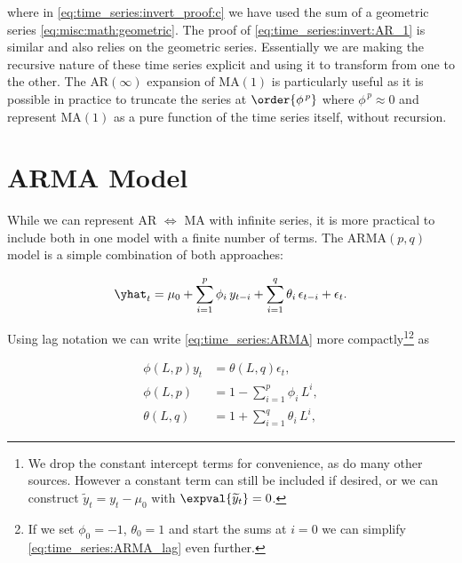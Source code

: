 \noindent where in \cref{eq:time_series:invert_proof:c} we have used
the sum of a geometric series \cref{eq:misc:math:geometric}.
The proof of \cref{eq:time_series:invert:AR_1} is similar and also relies on the geometric series.
Essentially we are making the recursive nature of these time series explicit and using it to transform from one to the other.
The $\text{AR}\left(\infty\right)$ expansion of $\text{MA}\left(1\right)$
is particularly useful as it is possible in practice to truncate the series at $\order{\phi^{\,p}}$
where $\phi^{\,p} \approx 0$ and represent $\text{MA}\left(1\right)$ as
a pure function of the time series itself, \ie without recursion.

\section{ARMA Model}
\label{time_series:ARMA}

While we can represent AR $\Leftrightarrow$ MA with infinite series,
it is more practical to include both in one model with a finite number of terms.
The $\text{ARMA}\left(p,q\right)$ model is a simple combination of
both approaches:

\begin{equation}\label{eq:time_series:ARMA}
\yhat_{t} = \mu_{0} + \sum_{i=1}^{p} \phi_{i}\, y_{t-i} + \sum_{i=1}^{q} \theta_{i}\, \epsilon_{t-i} + \epsilon_{t}.
\end{equation}

Using lag notation we can write \cref{eq:time_series:ARMA} more
compactly\footnote{We drop
the constant intercept terms for convenience, as do many other sources.
However a constant term can still be included if desired,
or we can construct $\widetilde{y}_{t} = y_{t} - \mu_{0}$ with $\expval{\widetilde{y}_{t}} = 0$.}\footnote{If we set
$\phi_{0}=-1$, $\theta_{0} = 1$ and start the sums at $i=0$
we can simplify \cref{eq:time_series:ARMA_lag} even further.} as

\begin{subequations}\label{eq:time_series:ARMA_lag}
\begin{align}
\phi\left(L,p\right) y_{t} &= \theta\left(L,q\right) \epsilon_{t}, \label{eq:time_series:ARMA_lag:def} \\
\phi\left(L,p\right) &= 1 - \sum_{i=1}^{p} \phi_{i}\, L^{i}, \label{eq:time_series:ARMA_lag:phi} \\
\theta\left(L,q\right) &= 1 + \sum_{i=1}^{q} \theta_{i}\, L^{i}, \label{eq:time_series:ARMA_lag:theta}
\end{align}
\end{subequations}

